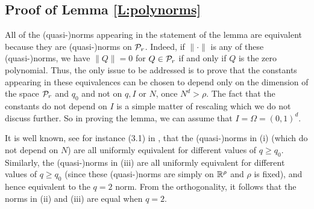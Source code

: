 
\subsection{Proof of Lemma \ref{L:polynorms}}
\label{Lemma22}
   

All of the (quasi-)norms appearing in the statement of the lemma are equivalent  because they are (quasi-)norms on ${\cal P}_r$. Indeed, if $\|\cdot\|$ is any of these (quasi-)norms,  we have $\|Q\|=0$ for $Q\in{\cal P}_r$ if and only if $Q$ is the zero polynomial.    Thus, the only issue to be addressed is to prove that the constants appearing in these equivalences can be chosen to depend only on the dimension of the space ${\cal P}_r$ and $q_0$ and not on $q,I$ or $N$,  once $N^d>\rho$.  The fact that the constants do not depend on $I$ is a simple matter of rescaling  which we do not discuss further.  So in proving the lemma,  we can assume that
$I=\Omega=(0,1)^d$.


It is well known, see for instance (3.1) in \cite{DS}, that the (quasi-)norms in (i) (which do not depend on $N$) are all uniformly equivalent for different values of $q \geq q_0$.
Similarly, the (quasi-)norms in (iii) are all uniformly equivalent for different values of $q \geq q_0$ (since these (quasi-)norms are simply on $\mathbb{R}^\rho$ and $\rho$ is fixed), and hence equivalent to the $q=2$ norm. From the orthogonality, it follows that the norms in  (ii) and (iii) are equal when $q = 2$. 

